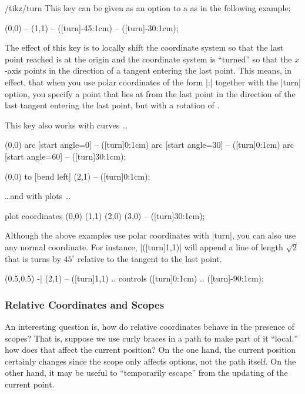 \begin{key}{/tikz/turn}
  This key can be given as an option to a  as in the
  following example:
\begin{codeexample}[]
\tikz \draw (0,0) -- (1,1) -- ([turn]-45:1cm) -- ([turn]-30:1cm);    
\end{codeexample}
  The effect of this key is to locally shift the coordinate system so
  that the last point reached is at the origin and the coordinate
  system is ``turned'' so that the $x$-axis points in the direction of
  a tangent entering the last point. This means, in effect, that when
  you use polar coordinates of the form |:| together with the |turn| option, you
  specify a point that lies at  from the last point in
  the direction of the last tangent entering the last point, but with
  a rotation of .

  This key also works with curves \dots
\begin{codeexample}[]
\tikz [delta angle=30, radius=1cm]
  \draw (0,0) arc [start angle=0]  -- ([turn]0:1cm)
              arc [start angle=30] -- ([turn]0:1cm)
              arc [start angle=60] -- ([turn]30:1cm);
\end{codeexample}
\begin{codeexample}[]
\tikz \draw (0,0) to [bend left] (2,1) -- ([turn]0:1cm);
\end{codeexample}

  \dots and with plots \dots
\begin{codeexample}[]
\tikz \draw plot coordinates {(0,0) (1,1) (2,0) (3,0) } -- ([turn]30:1cm);
\end{codeexample}

  Although the above examples use polar coordinates with |turn|, you
  can also use any normal coordinate. For instance, |([turn]1,1)| will
  append a line of length $\sqrt 2$ that is turns by $45^\circ$
  relative to the tangent to the last point.
\begin{codeexample}[]
\tikz \draw (0.5,0.5) -| (2,1) -- ([turn]1,1)
         .. controls ([turn]0:1cm) .. ([turn]-90:1cm);
\end{codeexample}
\end{key}


\subsubsection{Relative Coordinates and Scopes}
\label{section-scopes-relative}
An interesting question is, how do relative coordinates behave in the
presence of scopes? That is, suppose we use curly braces in a path to
make part of it ``local,'' how does that affect the current position?
On the one hand, the current position certainly changes since the
scope only affects options, not the path itself. On the other hand, it
may be useful to ``temporarily escape'' from the updating of the
current point.

